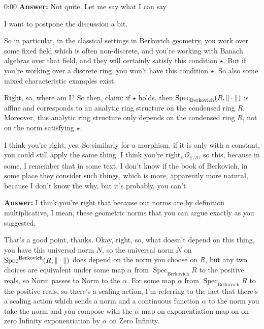 \begin{unfinished}{0:00}
\textbf{Answer:} Not quite. Let me say what I can say 

I want to postpone the discussion a bit.

So in particular, in the classical settings in Berkovich geometry, you work over some fixed field which is often non-discrete, and you're working with Banach algebras over that field, and they will certainly satisfy this condition $\star$. But if you're working over a discrete ring, you won't have this condition $\star$. 
So also some mixed characteristic examples exist.

Right, so, where am I? So then, claim: if $\star$ holds, then $\operatorname{Spec}_{\mathrm{Berkovich}} (R, \| \cdot \|)$ is affine and corresponds to an analytic ring structure on the condensed ring $R$. Moreover, this analytic ring structure only depends on the condensed ring $R$, not on the norm satisfying $\star$.

I think you're right, yes. So similarly for a morphism, if it is only with a constant, you could still apply the same thing. I think you're right, $\mathcal{O}_{\mathcal{E}/\mathcal{S}}$, so this, because in some, I remember that in some text, I don't know if the book of Berkovich, in some place they consider such things, which is more, apparently more natural, because I don't know the why, but it's probably, you can't.

\textbf{Answer:} I think you're right that because our norms are by definition multiplicative, I mean, these geometric norms that you can argue exactly as you suggested.

That's a good point, thanks. Okay, right, so, what doesn't depend on this thing, you have this universal norm $N$, so the universal norm $N$ on $\operatorname{Spec}^{\mathrm{Berkovich}} (R, \| \cdot \|)$ does depend on the norm you choose on $R$, but any two choices are equivalent under some map $\alpha$ from $\operatorname{Spec}_{\mathrm{Berkovich}} R$ to the positive reals, so Norm passes to Norm to the $\alpha$. For some map $\alpha$ from $\operatorname{Spec}_{\mathrm{Berkovich}} R$ to the positive reals, so there's a scaling action, I'm referring to the fact that there's a scaling action which sends a norm and a continuous function $\alpha$ to the norm you take the norm and you compose with the $\alpha$ map on exponentiation map on on zero Infinity exponentiation by $\alpha$ on Zero Infinity.


\end{unfinished}
